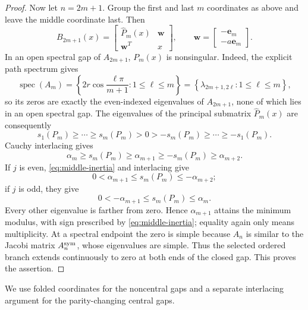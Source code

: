 \documentclass[a4paper,preprint,12pt,nopreprintline,sort&compress]{elsarticle}
\numberwithin{equation}{section}
\theoremstyle{remark}
\begin{document}
\begin{proof}
Now let \(n=2m+1\).  Group the first and last \(m\) coordinates as
above and leave the middle coordinate last.  Then
\begin{equation}\label{eq:odd-dilation}
 B_{2m+1}(x)=
 \begin{bmatrix}\widehat P_m(x)&\boldsymbol w\\\boldsymbol w^T&x\end{bmatrix},
 \qquad
 \boldsymbol w=\begin{bmatrix}-\mathbf e_m\\-a\mathbf e_m\end{bmatrix}.
\end{equation}
In an open spectral gap of \(A_{2m+1}\), \(P_m(x)\) is nonsingular.  Indeed,
the explicit path spectrum gives
\[
 \operatorname{spec}(A_m)
 =\left\{2r\cos\frac{\ell\pi}{m+1}:1\leq\ell\leq m\right\}
 =\left\{\lambda_{2m+1,2\ell}:1\leq\ell\leq m\right\},
\]
so its zeros are exactly the even-indexed eigenvalues of \(A_{2m+1}\), none
of which lies in an open spectral gap.
The eigenvalues of the principal submatrix \(\widehat P_m(x)\) are
consequently
\[
 s_1(P_m)\geq\cdots\geq s_m(P_m)>0>
 -s_m(P_m)\geq\cdots\geq-s_1(P_m).
\]
Cauchy interlacing gives
\[
 \alpha_m\geq s_m(P_m)\geq\alpha_{m+1}
 \geq-s_m(P_m)\geq\alpha_{m+2}.
\]
If \(j\) is even, \eqref{eq:middle-inertia} and interlacing give
\[
 0<\alpha_{m+1}\leq s_m(P_m)\leq-\alpha_{m+2};
\]
if \(j\) is odd, they give
\[
 0<-\alpha_{m+1}\leq s_m(P_m)\leq\alpha_m.
\]
Every other eigenvalue is farther from zero.  Hence
\(\alpha_{m+1}\) attains the minimum modulus, with sign prescribed by
\eqref{eq:middle-inertia}; equality again only means multiplicity.  At a
spectral endpoint the zero is simple because \(A_n\) is similar to the
Jacobi matrix \(A_n^{\rm sym}\), whose eigenvalues are simple.  Thus the selected
ordered branch extends continuously to zero at both ends of the closed
gap.  This proves the assertion.
\end{proof}

We use folded coordinates for the noncentral gaps and a separate
interlacing argument for the parity-changing central gaps.
\end{document}
